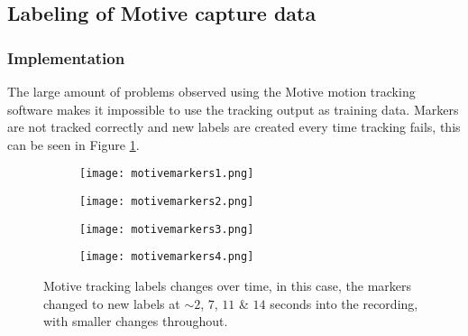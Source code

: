 \documentclass[../main.tex]{subfiles}
\begin{document}
\subsection{Labeling of Motive capture data}
\subsubsection{Implementation}
\label{sec:motivecleaning}


The large amount of problems observed using the Motive motion tracking software makes it impossible to use the tracking output as training data.
Markers are not tracked correctly and new labels are created every time tracking fails, this can be seen in Figure \ref{fig:motivelabels}.

\begin{figure}[H]
    \centering
    \begin{subfigure}[b]{0.49\textwidth}
        \centering
        \texttt{[image: motivemarkers1.png]}
    \end{subfigure}
    \hfill
    \centering
    \begin{subfigure}[b]{0.49\textwidth}
        \centering
        \texttt{[image: motivemarkers2.png]}
    \end{subfigure}
    \hfill
    \begin{subfigure}[b]{0.49\textwidth}
        \centering
        \texttt{[image: motivemarkers3.png]}
    \end{subfigure}
    \hfill
    \begin{subfigure}[b]{0.49\textwidth}
        \centering
        \texttt{[image: motivemarkers4.png]}
    \end{subfigure}
    \caption{Motive tracking labels changes over time, in this case, the markers changed to new labels at $\sim 2$, $7$, $11$ \& $14$ seconds into the recording, with smaller changes throughout.}
    \label{fig:motivelabels}
\end{figure}
\end{document}
